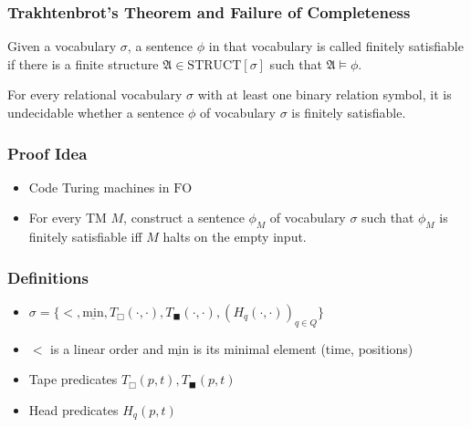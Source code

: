 \documentclass{beamer}
\newcommand{\FO}{\ensuremath{\mathrm{FO}}}
\newcommand{\structa}{\ensuremath{\mathfrak{A}}}
\newcommand{\minel}{\ensuremath{\underline{\mathrm{min}}}}
\newcommand{\blankcell}{\ensuremath{T_{\Box}}}
\newcommand{\nonblankcell}{\ensuremath{T_{\blacksquare}}}
\begin{document}
\begin{frame}
  \frametitle{Trakhtenbrot's Theorem and Failure of Completeness}

  \begin{definition}
    Given a vocabulary $\sigma$, a sentence $\phi$ in that vocabulary is called
    finitely satisfiable if there is a finite structure $\structa \in
    \mathrm{STRUCT}[\sigma]$ such that $\structa \models \phi$.
  \end{definition}
  
  \pause

  \begin{theorem}[Trakhtenbrot]
    For every relational vocabulary $\sigma$ with at least one binary relation
    symbol, it is undecidable whether a sentence $\phi$ of vocabulary
    $\sigma$ is finitely satisfiable.
  \end{theorem}

\end{frame}

\begin{frame}
  \frametitle{Proof Idea}

  \begin{itemize}
    \item Code Turing machines in $\FO$
    \item For every TM $M$, construct a sentence $\phi_M$ of vocabulary $\sigma$
    such that $\phi_M$ is finitely satisfiable iff $M$ halts on the empty input.
  \end{itemize}

\end{frame}

\begin{frame}
  \frametitle{Definitions}

  \begin{itemize}
    \item $\sigma = \{<, \minel, \blankcell(\cdot, \cdot),
    \nonblankcell(\cdot,\cdot), (H_q(\cdot, \cdot))_{q \in Q}\}$\\
    \item $<$ is a linear order and $\minel$ is its minimal element (time,
    positions)
    \item Tape predicates $\blankcell(p,t), \nonblankcell(p,t)$
    \item Head predicates $H_q(p,t)$
  \end{itemize}
  
\end{frame}
\end{document}
